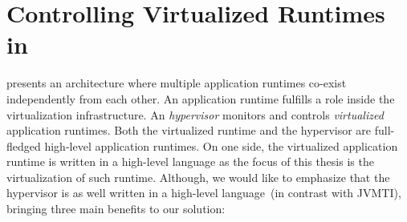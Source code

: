 




\section{Controlling Virtualized Runtimes in \Vtt} \label{sec:virtualization_overview}

\Vtt presents an architecture where multiple application runtimes co-exist independently from each other. An application runtime fulfills a role inside the virtualization infrastructure. An \emph{hypervisor} monitors and controls \emph{virtualized} application runtimes. Both the virtualized runtime and the hypervisor are full-fledged high-level application runtimes. On one side, the virtualized application runtime is written in a high-level language as the focus of this thesis is the virtualization of such runtime. Although, we would like to emphasize that the hypervisor is as well written in a high-level language~(in contrast with \eg JVMTI\cite{JVMPI}), bringing three main benefits to our solution:

